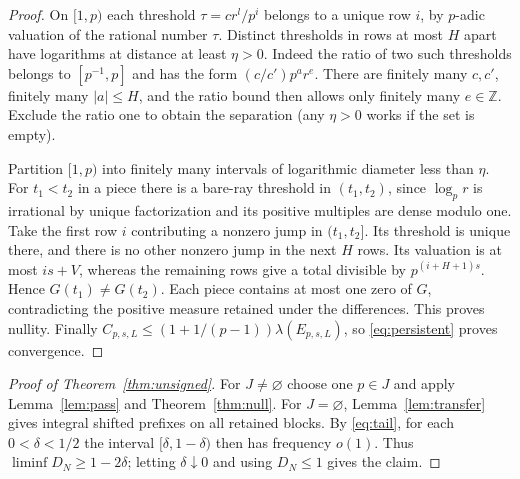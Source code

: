 \documentclass[11pt]{article}
\newcommand{\Z}{\mathbb Z}
\newcommand{\vol}{\lambda}
\begin{document}
\begin{proof}
On \([1,p)\) each threshold \(\tau=c r^l/p^i\) belongs to a unique row \(i\), by \(p\)-adic valuation of the rational number \(\tau\). Distinct thresholds in rows at most \(H\) apart have logarithms at distance at least \(\eta>0\). Indeed the ratio of two such thresholds belongs to \([p^{-1},p]\) and has the form \((c/c')p^a r^e\). There are finitely many \(c,c'\), finitely many \(|a|\le H\), and the ratio bound then allows only finitely many \(e\in\Z\). Exclude the ratio one to obtain the separation (any \(\eta>0\) works if the set is empty).

Partition \([1,p)\) into finitely many intervals of logarithmic diameter less than \(\eta\). For \(t_1<t_2\) in a piece there is a bare-ray threshold in \((t_1,t_2)\), since \(\log_p r\) is irrational by unique factorization and its positive multiples are dense modulo one. Take the first row \(i\) contributing a nonzero jump in \((t_1,t_2]\). Its threshold is unique there, and there is no other nonzero jump in the next \(H\) rows. Its valuation is at most \(is+V\), whereas the remaining rows give a total divisible by \(p^{(i+H+1)s}\). Hence \(G(t_1)\ne G(t_2)\). Each piece contains at most one zero of \(G\), contradicting the positive measure retained under the differences. This proves nullity. Finally \(C_{p,s,L}\le (1+1/(p-1))\vol(E_{p,s,L})\), so \eqref{eq:persistent} proves convergence.
\end{proof}

\begin{proof}[Proof of Theorem~\ref{thm:unsigned}]
For \(J\ne\varnothing\) choose one \(p\in J\) and apply Lemma~\ref{lem:pass} and Theorem~\ref{thm:null}. For \(J=\varnothing\), Lemma~\ref{lem:transfer} gives integral shifted prefixes on all retained blocks. By \eqref{eq:tail}, for each \(0<\delta<1/2\) the interval \([\delta,1-\delta)\) then has frequency \(o(1)\). Thus \(\liminf D_N\ge1-2\delta\); letting \(\delta\downarrow0\) and using \(D_N\le1\) gives the claim.
\end{proof}
\end{document}
